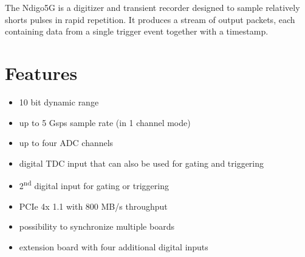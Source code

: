 The Ndigo5G is a digitizer and transient recorder designed to sample relatively shorts pulses in rapid repetition. It produces a stream of output packets, each containing data from a single trigger event together with a timestamp.
\section{Features}
	\begin{itemize}
		\item 10 bit dynamic range
		\item up to 5 Gsps sample rate (in 1 channel mode)
		\item up to four ADC channels
		\item digital TDC input that can also be used for gating and triggering
		\item 2\textsuperscript{nd} digital input for gating or triggering
		\item PCIe 4x 1.1 with 800 MB/s throughput
		\item possibility to synchronize multiple boards
		\item extension board with four additional digital inputs
	\end{itemize}
